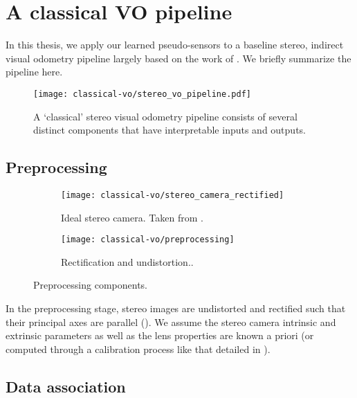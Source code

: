 \section{A classical VO pipeline}

In this thesis, we apply our learned pseudo-sensors to a baseline stereo, indirect visual odometry pipeline largely based on the work of \cite{furgale_phd11}. We briefly summarize the pipeline here.

\begin{figure}[h!]
\begin{center}
		\texttt{[image: classical-vo/stereo\_vo\_pipeline.pdf]}
		\caption{A `classical' stereo visual odometry pipeline consists of several distinct components that have interpretable inputs and outputs.}
  	\label{fig:vo_stereo_vo_pipeline}
\end{center}
\end{figure}

\subsection{Preprocessing}


\begin{figure}[h!]
     \centering
     \begin{subfigure}[b]{0.48\textwidth}
         \centering
     		\texttt{[image: classical-vo/stereo\_camera\_rectified]}
			\caption{Ideal stereo camera. Taken from \cite{furgale_phd11}.}
			 \label{fig:vo_stereo_camera}
     \end{subfigure}
     \hfill
     \begin{subfigure}[b]{0.48\textwidth}
         \centering
         \texttt{[image: classical-vo/preprocessing]}
        \caption{Rectification and undistortion..}
         \label{fig:vo_undistort_recitfy}
	 \end{subfigure}
    \caption{Preprocessing components. }
        \label{fig:vo_preprocessing}
\end{figure}

In the preprocessing stage, stereo images are undistorted and rectified such that their principal axes are parallel (). We assume the stereo camera intrinsic and extrinsic parameters as well as the lens properties are known a priori (or computed through a calibration process like that detailed in \cite{kelly_phd2011}).

\subsection{Data association}

